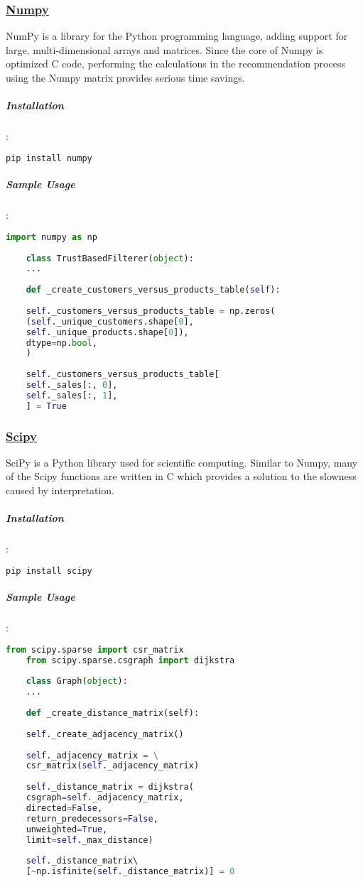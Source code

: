 \subsubsection{\href{https://numpy.org/}{Numpy}}
NumPy is a library for the Python programming language, adding support for large, multi-dimensional arrays and matrices. Since the core of Numpy is optimized C code, performing the calculations in the recommendation process using the Numpy matrix provides serious time savings.
\subparagraph{Installation}:
\begin{lstlisting}[language=bash]
	pip install numpy
\end{lstlisting}

\subparagraph{Sample Usage}:
\begin{lstlisting}[language=python, caption=Numpy example]
	import numpy as np
	
	class TrustBasedFilterer(object):
	...
	
	def _create_customers_versus_products_table(self):
	
	self._customers_versus_products_table = np.zeros(
	(self._unique_customers.shape[0],
	self._unique_products.shape[0]),
	dtype=np.bool,
	)
	
	self._customers_versus_products_table[
	self._sales[:, 0],
	self._sales[:, 1],
	] = True
\end{lstlisting}

\subsubsection{\href{https://www.scipy.org/}{Scipy}}
SciPy is a Python library used for scientific computing. Similar to Numpy, many of the Scipy functions are written in C which provides a solution to the slowness caused by interpretation.
\subparagraph{Installation}:
\begin{lstlisting}[language=bash]
	pip install scipy
\end{lstlisting}

\subparagraph{Sample Usage}:
\begin{lstlisting}[language=python, caption=Scipy example]
	from scipy.sparse import csr_matrix
	from scipy.sparse.csgraph import dijkstra
	
	class Graph(object):
	...
	
	def _create_distance_matrix(self):
	
	self._create_adjacency_matrix()
	
	self._adjacency_matrix = \
	csr_matrix(self._adjacency_matrix)
	
	self._distance_matrix = dijkstra( 
	csgraph=self._adjacency_matrix, 
	directed=False, 
	return_predecessors=False, 
	unweighted=True,
	limit=self._max_distance)
	
	self._distance_matrix\ 
	[~np.isfinite(self._distance_matrix)] = 0
\end{lstlisting}
